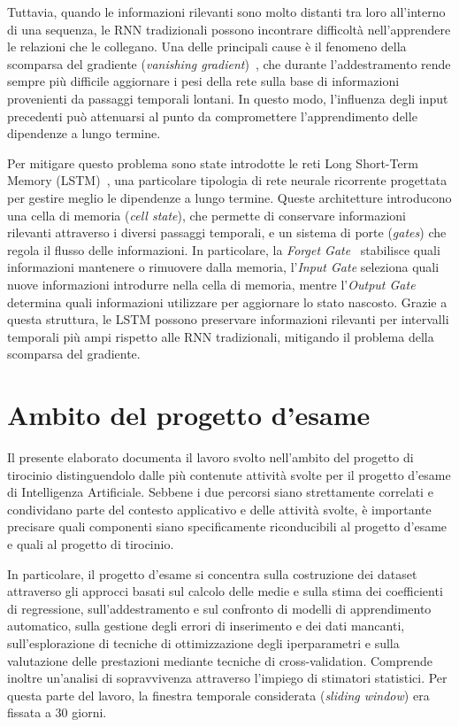 \documentclass[a4paper,12pt]{report}
\begin{document}
Tuttavia, quando le informazioni rilevanti sono molto distanti tra loro all'interno di una sequenza, le RNN tradizionali possono incontrare difficoltà nell'apprendere le relazioni che le collegano. Una delle principali cause è il fenomeno della scomparsa del gradiente (\textit{vanishing gradient})~\cite{VanishingGradient1994}, che durante l'addestramento rende sempre più difficile aggiornare i pesi della rete sulla base di informazioni provenienti da passaggi temporali lontani. In questo modo, l'influenza degli input precedenti può attenuarsi al punto da compromettere l'apprendimento delle dipendenze a lungo termine.

Per mitigare questo problema sono state introdotte le reti Long Short-Term Memory (LSTM)~\cite{LSTM/neco.1997.9.8.1735}, una particolare tipologia di rete neurale ricorrente progettata per gestire meglio le dipendenze a lungo termine. Queste architetture introducono una cella di memoria (\textit{cell state}), che permette di conservare informazioni rilevanti attraverso i diversi passaggi temporali, e un sistema di porte (\textit{gates}) che regola il flusso delle informazioni. In particolare, la \textit{Forget Gate}~\cite{LSTMForgetGate2000} stabilisce quali informazioni mantenere o rimuovere dalla memoria, l'\textit{Input Gate} seleziona quali nuove informazioni introdurre nella cella di memoria, mentre l'\textit{Output Gate} determina quali informazioni utilizzare per aggiornare lo stato nascosto. Grazie a questa struttura, le LSTM possono preservare informazioni rilevanti per intervalli temporali più ampi rispetto alle RNN tradizionali, mitigando il problema della scomparsa del gradiente.

\section{Ambito del progetto d'esame}

Il presente elaborato documenta il lavoro svolto nell'ambito del progetto di tirocinio distinguendolo dalle più contenute attività svolte per il progetto d'esame di Intelligenza Artificiale. Sebbene i due percorsi siano strettamente correlati e condividano parte del contesto applicativo e delle attività svolte, è importante precisare quali componenti siano specificamente riconducibili al progetto d'esame e quali al progetto di tirocinio.

In particolare, il progetto d'esame si concentra sulla costruzione dei dataset attraverso gli approcci basati sul calcolo delle medie e sulla stima dei coefficienti di regressione, sull'addestramento e sul confronto di modelli di apprendimento automatico, sulla gestione degli errori di inserimento e dei dati mancanti, sull'esplorazione di tecniche di ottimizzazione degli iperparametri e sulla valutazione delle prestazioni mediante tecniche di cross-validation. Comprende inoltre un'analisi di sopravvivenza attraverso l'impiego di stimatori statistici. Per questa parte del lavoro, la finestra temporale considerata (\textit{sliding window}) era fissata a 30 giorni.
\end{document}
